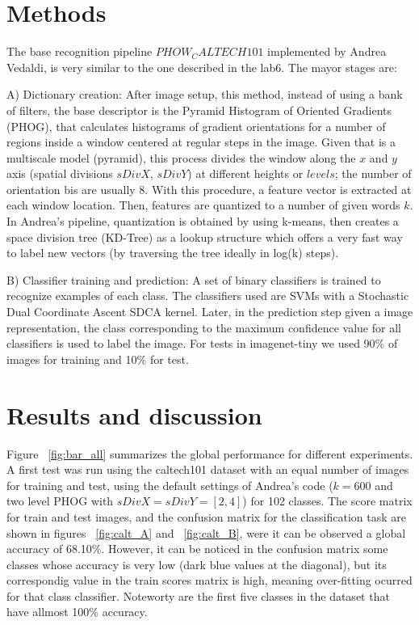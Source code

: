 \documentclass[10pt,two column,letter paper]{article}
\begin{document}
\section{Methods}
The base recognition pipeline $PHOW_CALTECH101$ implemented by Andrea Vedaldi, is very similar to the one described in the lab6. The mayor stages are:

A) Dictionary creation: After image setup, this method, instead of using a bank of filters, the base descriptor is the Pyramid Histogram of Oriented Gradients (PHOG), that
calculates histograms of gradient orientations for a number of regions inside a window centered at regular steps in the image. Given that is a multiscale model
(pyramid), this process divides the window along the $x$ and $y$ axis (spatial divisions $sDivX$, $sDivY$) at different heights or $levels$; the number
of orientation bis are usually 8. With this procedure, a feature vector is extracted at each window location. Then, features are quantized to a number
of given words $k$. In Andrea's pipeline, quantization is obtained by using k-means, then creates a space division tree (KD-Tree) as a lookup structure which
 offers a very fast way to label new vectors (by traversing the tree ideally in log(k) steps).

B) Classifier training and prediction: A set of binary classifiers is trained to recognize examples of each class. The classifiers used are SVMs with a  
Stochastic Dual Coordinate Ascent SDCA kernel. Later, in the prediction step given a image representation, the class corresponding to the maximum confidence
value for all classifiers is used to label the image. For tests in imagenet-tiny we used 90\% of images for training and 10\% for test.


\section{Results and discussion}
Figure ~\ref{fig:bar_all} summarizes the global performance for different experiments. A first test was run using the caltech101 dataset with an equal
number of images for training and test, using the default settings of Andrea's code ($k=$600 and two level PHOG with $sDivX=sDivY=[2,4]$) for 102 classes.
The score matrix for train and test images, and the confusion matrix for the classification task are shown in figures ~\ref{fig:calt_A} and ~\ref{fig:calt_B}, 
were it can be observed a global accuracy of 68.10\%. However, it can be noticed in the confusion matrix some classes whose accuracy is very low 
(dark blue values at the diagonal), but its correspondig value in the train scores matrix is high, meaning over-fitting ocurred
for that class classifier. Noteworty are the first five classes in the dataset that have allmost 100\% accuracy.
\end{document}
